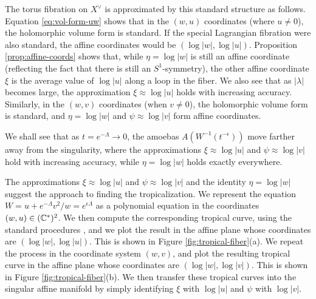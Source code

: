 \documentclass[12pt]{amsart}
\begin{document}
The torus fibration on $X^\vee$ is approximated by this standard
structure as follows. Equation \eqref{eq:vol-form-uw} shows that in the
$(w,u)$ coordinates (where $u \neq 0$), the holomorphic volume form is
standard. If the special Lagrangian fibration were also standard, the
affine coordinates would be $(\log|w|,\log|u|)$. Proposition
\ref{prop:affine-coords} shows that, while $\eta = \log|w|$ is still
an affine coordinate (reflecting the fact that there is still an
$S^1$-symmetry), the other affine coordinate $\xi$ is the average
value of $\log|u|$ along a loop in the fiber. We also see that as
$|\lambda|$ becomes large, the approximation $\xi \approx \log|u|$
holds with increasing accuracy. Similarly, in the $(w,v)$ coordinates
(when $v \neq 0$), the holomorphic volume form is standard, and $\eta
= \log|w|$ and $\psi \approx \log|v|$ form affine coordinates.

We shall see that as $t = e^{-\Lambda} \to 0$, the amoebas
$A(W^{-1}(t^{-\epsilon}))$ move farther away from the
singularity, where the approximations $\xi \approx \log|u|$ and $\psi \approx
\log|v|$ hold with increasing accuracy, while $\eta = \log|w|$ holds exactly
everywhere.






The approximations $\xi \approx \log|u|$ and $\psi \approx \log|v|$ and the identity $\eta = \log|w|$ suggest the approach to finding the tropicalization. We represent the equation $W = u + e^{-\Lambda}v^2/w = e^{\epsilon \Lambda}$ as a polynomial equation in the coordinates $(w,u) \in (\mathbb{C}^*)^2$. We then compute the corresponding tropical curve, using the standard procedures \cite{tropical-AG}, and we plot the result in the affine plane whose coordinates are $(\log|w|, \log|u|)$. This is shown in Figure \ref{fig:tropical-fiber}(a). We repeat the process in the coordinate system $(w,v)$, and plot the resulting tropical curve in the affine plane whose coordinates are $(\log|w|, \log|v|)$. This is shown in Figure \ref{fig:tropical-fiber}(b). We then transfer these tropical curves into the singular affine manifold by simply identifying $\xi$ with $\log|u|$ and $\psi$ with $\log|v|$. 
\end{document}
